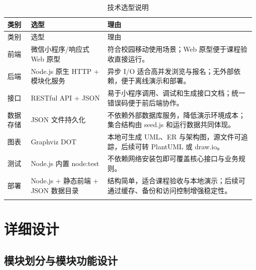 \documentclass[a4paper]{article}
\begin{document}
\begin{longtable}{P{2.3cm} P{4.1cm} P{8.8cm}}
  \toprule
  类别 & 选型 & 理由 \\
  \midrule
  \endfirsthead
  \toprule
  类别 & 选型 & 理由 \\
  \midrule
  \endhead
  前端 & 微信小程序/响应式 Web 原型 & 符合校园移动使用场景；Web 原型便于课程验收直接运行。 \\
  后端 & Node.js 原生 HTTP + 模块化服务 & 异步 I/O 适合高并发浏览与报名；无外部依赖，便于离线演示和部署。 \\
  接口 & RESTful API + JSON & 易于小程序调用、调试和生成接口文档；统一错误码便于前后端协作。 \\
  数据存储 & JSON 文件持久化 & 不依赖外部数据库服务，降低演示环境成本；集合结构由 seed.js 和运行数据共同体现。 \\
  图表 & Graphviz DOT & 本地可生成 UML、ER 与架构图，源文件可追踪，后续可转 PlantUML 或 draw.io。 \\
  测试 & Node.js 内置 node:test & 不依赖网络安装包即可覆盖核心接口与业务规则。 \\
  部署 & Node.js + 静态前端 + JSON 数据目录 & 结构简单，适合课程验收与本地演示；后续可通过缓存、备份和访问控制增强稳定性。 \\
  \bottomrule
  \caption{技术选型说明}
\end{longtable}

\section{详细设计}

\subsection{模块划分与模块功能设计}
\end{document}
